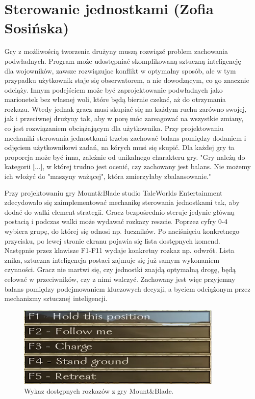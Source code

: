 \section{Sterowanie jednostkami (Zofia Sosińska)}\label{chap:mb}
Gry z możliwością tworzenia drużyny muszą rozwiązć problem zachowania podwładnych. Program może udostępniać
skomplikowaną sztuczną inteligencję dla wojowników, zawsze rozwiązujac konflikt w optymalny sposób, ale w tym przypadku 
użytkownik staje się obserwatorem, a nie dowodzącym, co go znacznie odciąży. Innym podejściem może być zaprojektowanie podwładnych jako 
marionetek bez własnej woli, które będą biernie czekać, aż do otrzymania rozkazu. Wtedy jednak gracz musi skupiać się na 
każdym ruchu zarówno swojej, jak i przeciwnej drużyny tak, aby w porę móc zareagować na wszystkie zmiany, co
jest rozwiązaniem obciążającym dla użytkownika. Przy projektowaniu mechaniki sterowania jednostkami trzeba zachować balans pomiędzy 
dodaniem i odjęciem użytkownikowi zadań, na kórych musi się skupić. Dla każdej gry ta proporcja może być inna, zależnie
od unikalnego charakteru gry. "Gry należą do kategorii [...], w której trudno jest ocenić, czy zachowany jest balans.
 Nie możemy ich włożyć do "maszyny ważącej", która zmierzyłaby zbalansowanie."\cite{balancing_game}

Przy projektowaniu gry Mount\&Blade studio TaleWorlds Entertainment zdecydowało się zaimplementować mechanikę sterowania jednostkami tak, aby 
dodać do walki element strategii. Gracz bezpośrednio steruje jedynie główną postacią i podczas walki może wydawać rozkazy reszcie. Poprzez
cyfry 0-4 wybiera grupę, do której się odnosi np. łuczników. Po naciśnięciu konkretnego przycisku, po lewej stronie ekranu pojawia się lista dostępnych komend.
Następnie przez klawisze F1-F11 wydaje konkretny rozkaz np. odwrót. Lista znika, sztuczna inteligencja postaci zajmuje się już samym wykonaniem czynności. 
Gracz nie martwi się, czy jednostki znajdą optymalną drogę, 
będą celować w przeciwników, czy z nimi walczyć. Zachowany jest więc przyjemny balans pomiędzy podejmowaniem kluczowych decyzji, a byciem odciążonym przez mechanizmy sztucznej inteligencji.

\begin{figure}[h!tbp]
    \centering
    \includegraphics[width=0.9\textwidth]{images/ui/commandsMountBla.png}
    \caption{Wykaz dostępnych rozkazów z gry Mount\&Blade.}\label{fig:MountnBlade}
    \label{fig:mnb}
\end{figure}
